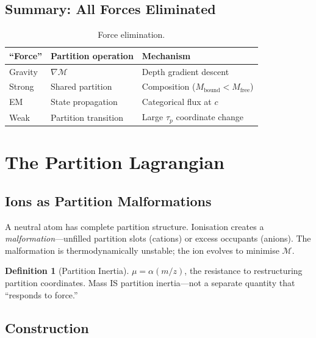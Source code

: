 \documentclass[11pt,twocolumn,a4paper]{article}
\theoremstyle{definition}
\newtheorem{definition}[theorem]{Definition}
\theoremstyle{remark}
\newcommand{\Depth}{\mathcal{M}}
\newcommand{\partinert}{\mu}
\newcommand{\taup}{\tau_p}
\newcommand{\Mfree}{M_{\mathrm{free}}}
\newcommand{\Mbound}{M_{\mathrm{bound}}}
\begin{document}
\subsection{Summary: All Forces Eliminated}

\begin{table}[H]
\centering
\caption{Force elimination.}
\small
\begin{tabular}{lll}
\toprule
\textbf{``Force''} & \textbf{Partition operation} & \textbf{Mechanism} \\
\midrule
Gravity & $\nabla\Depth$ & Depth gradient descent \\
Strong & Shared partition & Composition ($\Mbound < \Mfree$) \\
EM & State propagation & Categorical flux at $c$ \\
Weak & Partition transition & Large $\taup$ coordinate change \\
\bottomrule
\end{tabular}
\end{table}

\section{The Partition Lagrangian}
\label{sec:lagrangian}

\subsection{Ions as Partition Malformations}

A neutral atom has complete partition structure. Ionisation creates a \emph{malformation}---unfilled partition slots (cations) or excess occupants (anions). The malformation is thermodynamically unstable; the ion evolves to minimise $\Depth$.

\begin{definition}[Partition Inertia]
$\partinert = \alpha(m/z)$, the resistance to restructuring partition coordinates. Mass IS partition inertia---not a separate quantity that ``responds to force.''
\end{definition}

\subsection{Construction}
\end{document}
